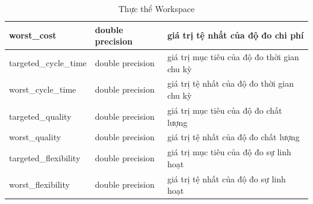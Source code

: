 \begin{center}
\begin{table}[H]
{\begin{tabular}{ |p{3cm} |p{3cm} |p{8cm}|}
                                \hline
                                worst{\_}cost & double precision & giá trị tệ nhất của độ đo chi phí \\
                                \hline
                                targeted{\_}cycle{\_}time & double precision & giá trị mục tiêu của độ đo thời gian chu kỳ \\
                                \hline
                                worst{\_}cycle{\_}time & double precision & giá trị tệ nhất của độ đo thời gian chu kỳ \\
                                \hline
                                targeted{\_}quality & double precision & giá trị mục tiêu của độ đo chất lượng \\
                                \hline
                                worst{\_}quality & double precision & giá trị tệ nhất của độ đo chất lượng \\
                                \hline
                                targeted{\_}flexibility & double precision & giá trị mục tiêu của độ đo sự linh hoạt \\
                                \hline
                                worst{\_}flexibility & double precision & giá trị tệ nhất của độ đo sự linh hoạt \\
                                \hline
                        \end{tabular}
                }
                \caption{Thực thể Workspace}
        \end{table}
\end{center}

